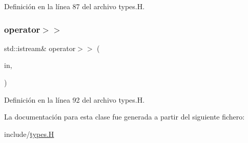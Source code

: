 Definición en la línea 87 del archivo types.\+H.

\mbox{\label{class_designar_1_1_empty_class_aa3fc576ae898cf56f66f6ebf12251803}} 
\subsubsection{\texorpdfstring{operator$>$$>$}{operator>>}}
{\footnotesize\ttfamily std\+::istream\& operator$>$$>$ (\begin{DoxyParamCaption}\item[{std\+::istream \&}]{in,  }\item[{\hyperlink{class_designar_1_1_empty_class}{Empty\+Class} \&}]{ }\end{DoxyParamCaption})\hspace{0.3cm}{\ttfamily [friend]}}



Definición en la línea 92 del archivo types.\+H.



La documentación para esta clase fue generada a partir del siguiente fichero\+:\begin{DoxyCompactItemize}
\item 
include/\hyperlink{types_8_h}{types.\+H}\end{DoxyCompactItemize}
